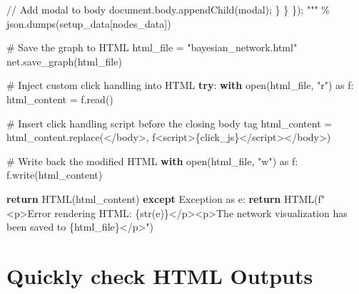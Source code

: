 \documentclass[
  11pt,
  letterpaper,
]{book}
\newenvironment{Shaded}{\begin{snugshade}}{\end{snugshade}}
\newcommand{\BuiltInTok}[1]{\textcolor[rgb]{0.00,0.23,0.31}{#1}}
\newcommand{\CommentTok}[1]{\textcolor[rgb]{0.37,0.37,0.37}{#1}}
\newcommand{\ControlFlowTok}[1]{\textcolor[rgb]{0.00,0.23,0.31}{\textbf{#1}}}
\newcommand{\ImportTok}[1]{\textcolor[rgb]{0.00,0.46,0.62}{#1}}
\newcommand{\NormalTok}[1]{\textcolor[rgb]{0.00,0.23,0.31}{#1}}
\newcommand{\OperatorTok}[1]{\textcolor[rgb]{0.37,0.37,0.37}{#1}}
\newcommand{\PreprocessorTok}[1]{\textcolor[rgb]{0.68,0.00,0.00}{#1}}
\newcommand{\SpecialCharTok}[1]{\textcolor[rgb]{0.37,0.37,0.37}{#1}}
\newcommand{\SpecialStringTok}[1]{\textcolor[rgb]{0.13,0.47,0.30}{#1}}
\newcommand{\StringTok}[1]{\textcolor[rgb]{0.13,0.47,0.30}{#1}}
\begin{document}
\begin{Shaded}
\begin{Highlighting}[]
\StringTok{                // Add modal to body}
\StringTok{                document.body.appendChild(modal);}
\StringTok{            \}}
\StringTok{        \}}
\StringTok{    \});}
\StringTok{    """} \OperatorTok{\%}\NormalTok{ json.dumps(setup\_data[}\StringTok{\textquotesingle{}nodes\_data\textquotesingle{}}\NormalTok{])}

    \CommentTok{\# Save the graph to HTML}
\NormalTok{    html\_file }\OperatorTok{=} \StringTok{"bayesian\_network.html"}
\NormalTok{    net.save\_graph(html\_file)}

    \CommentTok{\# Inject custom click handling into HTML}
    \ControlFlowTok{try}\NormalTok{:}
        \ControlFlowTok{with} \BuiltInTok{open}\NormalTok{(html\_file, }\StringTok{"r"}\NormalTok{) }\ImportTok{as}\NormalTok{ f:}
\NormalTok{            html\_content }\OperatorTok{=}\NormalTok{ f.read()}

        \CommentTok{\# Insert click handling script before the closing body tag}
\NormalTok{        html\_content }\OperatorTok{=}\NormalTok{ html\_content.replace(}\StringTok{\textquotesingle{}\textless{}/body\textgreater{}\textquotesingle{}}\NormalTok{, }\SpecialStringTok{f\textquotesingle{}\textless{}script\textgreater{}}\SpecialCharTok{\{}\NormalTok{click\_js}\SpecialCharTok{\}}\SpecialStringTok{\textless{}/script\textgreater{}\textless{}/body\textgreater{}\textquotesingle{}}\NormalTok{)}

        \CommentTok{\# Write back the modified HTML}
        \ControlFlowTok{with} \BuiltInTok{open}\NormalTok{(html\_file, }\StringTok{"w"}\NormalTok{) }\ImportTok{as}\NormalTok{ f:}
\NormalTok{            f.write(html\_content)}

        \ControlFlowTok{return}\NormalTok{ HTML(html\_content)}
    \ControlFlowTok{except} \PreprocessorTok{Exception} \ImportTok{as}\NormalTok{ e:}
        \ControlFlowTok{return}\NormalTok{ HTML(}\SpecialStringTok{f"\textless{}p\textgreater{}Error rendering HTML: }\SpecialCharTok{\{}\BuiltInTok{str}\NormalTok{(e)}\SpecialCharTok{\}}\SpecialStringTok{\textless{}/p\textgreater{}\textless{}p\textgreater{}The network visualization has been saved to \textquotesingle{}}\SpecialCharTok{\{}\NormalTok{html\_file}\SpecialCharTok{\}}\SpecialStringTok{\textquotesingle{}\textless{}/p\textgreater{}"}\NormalTok{)}
\end{Highlighting}
\end{Shaded}

\chapter{Quickly check HTML Outputs}\label{quickly-check-html-outputs}
\end{document}
